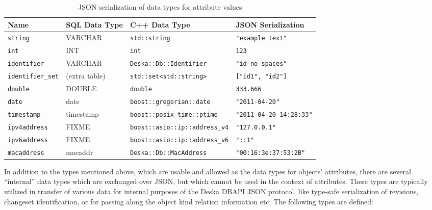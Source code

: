 \documentclass{article}
\begin{document}
\begin{longtable}{ p{24mm} | p{25mm} p{47mm} p{30mm} }
    \caption{JSON serialization of data types for attribute values} \\
    Name & SQL Data Type & C++ Data Type & JSON Serialization \\
    \hline
    \endhead
    {\tt string} & VARCHAR & {\tt std::string} & {\tt "example text"} \\
    {\tt int} & INT & {\tt int} & {\tt 123} \\
    {\tt identifier} & VARCHAR & {\tt Deska::Db::Identifier} & {\tt "id-no-spaces"} \\
    {\tt identifier\_set} & (extra table) & {\tt std::set<std::string>} & {\tt ["id1", "id2"]} \\
    {\tt double} & DOUBLE & {\tt double} & {\tt 333.666} \\
    {\tt date} & date & {\tt boost::gregorian::date} & {\tt "2011-04-20"} \\
    {\tt timestamp} & timestamp & {\tt boost::posix\_time::ptime} & {\tt "2011-04-20 14:28:33"} \\
    {\tt ipv4address} & FIXME & {\tt boost::asio::ip::address\_v4} & {\tt "127.0.0.1"} \\
    {\tt ipv6address} & FIXME & {\tt boost::asio::ip::address\_v6} & {\tt "::1"} \\
    {\tt macaddress} & macaddr & {\tt Deska::Db::MacAddress} & {\tt "00:16:3e:37:53:2B"} \\
\end{longtable}

In addition to the types mentioned above, which are usable and allowed as the data types for objects' attributes, there
are several ``internal'' data types which are exchanged over JSON, but which cannot be used in the context of
attributes.  These types are typically utilized in transfer of various data for internal purposes of the Deska
DBAPI JSON protocol, like type-safe serialization of revisions, changeset identification, or for passing along the object kind
relation information etc.  The following types are defined:
\end{document}
